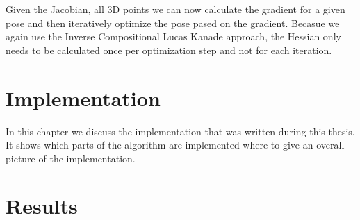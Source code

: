 \documentclass[11pt,a4paper,titlepage,oneside]{report}
\begin{document}
Given the Jacobian, all 3D points we can now calculate the gradient for a given pose and then iteratively optimize the pose pased on the gradient. Becasue we again use the Inverse Compositional Lucas Kanade approach, the Hessian only needs to be calculated once per optimization step and not for each iteration.


\chapter{Implementation}

In this chapter we discuss the implementation that was written during this thesis. It shows which parts of the algorithm are implemented where to give an overall picture of the implementation.

\chapter{Results}

\printbibliography
\end{document}
